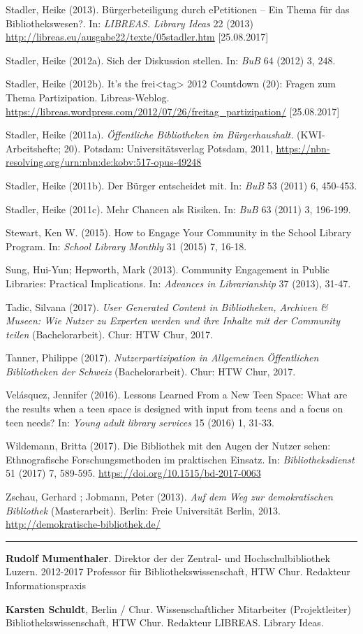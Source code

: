 \documentclass[a4paper,
fontsize=11pt,
oneside,
numbers=noperiodatend,
parskip=half-,
bibliography=totoc,
final
]{scrartcl}
\begin{document}
Stadler, Heike (2013). Bürgerbeteiligung durch ePetitionen -- Ein Thema
für das Bibliothekswesen?. In: \emph{LIBREAS. Library Ideas} 22 (2013)
\url{http://libreas.eu/ausgabe22/texte/05stadler.htm} {[}25.08.2017{]}

Stadler, Heike (2012a). Sich der Diskussion stellen. In: \emph{BuB} 64
(2012) 3, 248.

Stadler, Heike (2012b). It's the frei\textless{}tag\textgreater{} 2012
Countdown (20): Fragen zum Thema Partizipation. Libreas-Weblog.
\url{https://libreas.wordpress.com/2012/07/26/freitag_partizipation/}
{[}25.08.2017{]}

Stadler, Heike (2011a). \emph{Öffentliche Bibliotheken im
Bürgerhaushalt.} (KWI-Arbeitshefte; 20). Potsdam: Universitätsverlag
Potsdam, 2011,
\url{https://nbn-resolving.org/urn:nbn:de:kobv:517-opus-49248}

Stadler, Heike (2011b). Der Bürger entscheidet mit. In: \emph{BuB} 53
(2011) 6, 450-453.

Stadler, Heike (2011c). Mehr Chancen als Risiken. In: \emph{BuB} 63
(2011) 3, 196-199.

Stewart, Ken W. (2015). How to Engage Your Community in the School
Library Program. In: \emph{School Library Monthly} 31 (2015) 7, 16-18.

Sung, Hui-Yun; Hepworth, Mark (2013). Community Engagement in Public
Libraries: Practical Implications. In: \emph{Advances in Librarianship}
37 (2013), 31-47.

Tadic, Silvana (2017). \emph{User Generated Content in Bibliotheken,
Archiven \& Museen: Wie Nutzer zu Experten werden und ihre Inhalte mit
der Community teilen} (Bachelorarbeit). Chur: HTW Chur, 2017.

Tanner, Philippe (2017). \emph{Nutzerpartizipation in Allgemeinen
Öffentlichen Bibliotheken der Schweiz} (Bachelorarbeit). Chur: HTW Chur,
2017.

Velásquez, Jennifer (2016). Lessons Learned From a New Teen Space: What
are the results when a teen space is designed with input from teens and
a focus on teen needs? In: \emph{Young adult library services} 15 (2016)
1, 31-33.

Wildemann, Britta (2017). Die Bibliothek mit den Augen der Nutzer sehen:
Ethnografische Forschungsmethoden im praktischen Einsatz. In:
\emph{Bibliotheksdienst} 51 (2017) 7, 589-595.
\url{https://doi.org/10.1515/bd-2017-0063}

Zschau, Gerhard ; Jobmann, Peter (2013). \emph{Auf dem Weg zur
demokratischen Bibliothek} (Masterarbeit). Berlin: Freie Universität
Berlin, 2013. \url{http://demokratische-bibliothek.de/}

\begin{center}\rule{0.5\linewidth}{\linethickness}\end{center}

\textbf{Rudolf Mumenthaler}. Direktor der der Zentral- und
Hochschulbibliothek Luzern. 2012-2017 Professor für
Bibliothekswissenschaft, HTW Chur. Redakteur Informationspraxis

\textbf{Karsten Schuldt}, Berlin / Chur. Wissenschaftlicher Mitarbeiter
(Projektleiter) Bibliothekswissenschaft, HTW Chur. Redakteur LIBREAS.
Library Ideas.
\end{document}
